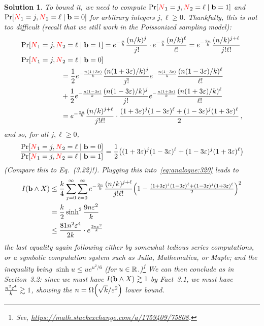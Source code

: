 \documentclass[biber,plain]{nowfnt} %
\newtheorem{solution}{Solution}[chapter]
\newcommand{\occur}{\textcolor{red}{N}}
\newcommand{\occur}{N}
\begin{document}
\begin{solution}
 To bound it, we need to compute $\bPr{\occur_1=j, \occur_2 = \ell\mid \mathbf{b}=\accept }$ and $\bPr{\occur_1=j, \occur_2 = \ell\mid \mathbf{b}=\reject }$ for arbitrary integers $j,\ell\geq 0$. Thankfully, this is not too difficult (recall that we still work in the Poissonized sampling model):
\begin{align*}
\bPr{\occur_1=j, \occur_2 = \ell\mid \mathbf{b}=\accept }
&= e^{-\frac{\ns}{\ab}} \frac{(\ns/\ab)^j}{j!}\cdot e^{-\frac{\ns}{\ab}} \frac{(\ns/\ab)^\ell}{\ell!}
= e^{-\frac{2\ns}{\ab}} \frac{(\ns/\ab)^{j+\ell}}{j!\ell!} \\
\bPr{\occur_1=j, \occur_2 = \ell\mid \mathbf{b}=\reject } \\
&\hspace{-6em}= \frac{1}{2} e^{-\frac{\ns(1+3\dst)}{\ab}} \frac{(\ns(1+3\dst)/\ab)^j}{j!} e^{-\frac{\ns(1-3\dst)}{\ab}} \frac{(\ns(1-3\dst)/\ab)^\ell}{\ell!}  \\
&\hspace{-6em}+ \frac{1}{2} e^{-\frac{\ns(1-3\dst)}{\ab}} \frac{(\ns(1-3\dst)/\ab)^j}{j!} e^{-\frac{\ns(1+3\dst)}{\ab}} \frac{(\ns(1+3\dst)/\ab)^\ell}{\ell!} \\
&\hspace{-6em}=  e^{-\frac{2\ns}{\ab}} \frac{(\ns/\ab)^{j+\ell}}{j!\ell!} \cdot \frac{(1+3\dst)^j(1-3\dst)^\ell+(1-3\dst)^j(1+3\dst)^\ell}{2}\,,
\end{align*}
and so, for all $j,\ell\geq 0$,
\begin{equation}
\frac{\bPr{\occur_1=j, \occur_2 = \ell\mid \mathbf{b}=\reject }}{\bPr{\occur_1=j, \occur_2 = \ell\mid \mathbf{b}=\accept }} = \frac{1}{2}\Paren{(1+3\dst)^j(1-3\dst)^\ell+(1-3\dst)^j(1+3\dst)^\ell}
\end{equation}
\emph{(Compare this to Eq.~(3.22)!)}. Plugging this into~\cref{eq:analogue:320} leads to
\begin{align}
	\mutualinfo{\mathbf{b}}{X} 
	&\leq \frac{\ab}{4} \sum_{j=0}^\infty\sum_{\ell=0}^\infty e^{-\frac{2\ns}{\ab}} \frac{(\ns/\ab)^{j+\ell}}{j!\ell!}\Paren{1- \tfrac{(1+3\dst)^j(1-3\dst)^\ell+(1-3\dst)^j(1+3\dst)^\ell}{2} }^2 \notag\\
	&=  \frac{\ab}{2} \sinh^2 \frac{9\ns \dst^2}{\ab} \notag\\
	&\leq \frac{81\ns^2 \dst^4}{2\ab} \cdot e^{\frac{3\ns \dst^2}{\ab}}
\end{align}
the last equality again following either by somewhat tedious series computations, or a symbolic computation system such as Julia, Mathematica, or Maple; and the inequality being $\sinh u \leq u e^{u^2/6}$ (for $u\in\mathbb{R}$.)\footnote{See, \eg \url{https://math.stackexchange.com/a/1759409/75808}.} We can then conclude as in Section~3.2: since we must have $\mutualinfo{\mathbf{b}}{X}  \gtrsim 1$ by Fact~3.1, we must have $\frac{n^2 \varepsilon^4}{k} \gtrsim 1$, showing the $\ns = \bigOmega{\sqrt{\ab}/\dst^2}$ lower bound.
\end{solution}
\end{document}
